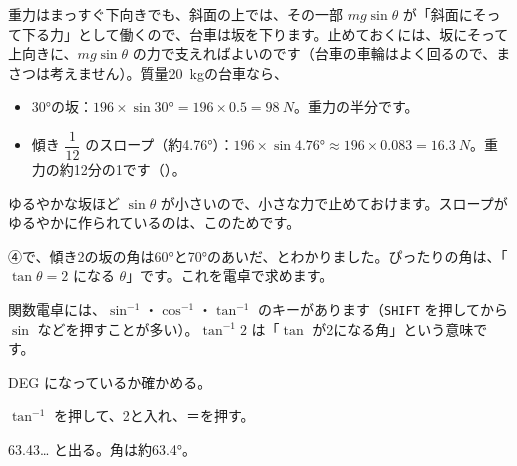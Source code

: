 重力はまっすぐ下向きでも、斜面の上では、その一部 $mg\sin\theta$ が「斜面にそって下る力」として働くので、台車は坂を下ります。止めておくには、坂にそって上向きに、$mg\sin\theta$ の力で支えればよいのです（台車の車輪はよく回るので、まさつは考えません）。質量\qty{20}{kg}の台車なら、
\begin{itemize}[leftmargin=1.2\zw, itemsep=1pt, topsep=2pt, label={\color{\bkTT}●}]
\item \ang{30}の坂：$196\times\sin\ang{30}=196\times0.5=\qty{98}{N}$。重力の半分です。
\item 傾き $\dfrac{1}{12}$ のスロープ（約\ang{4.76}）：$196\times\sin\ang{4.76}\approx196\times0.083=\qty{16.3}{N}$。重力の約12分の1です（）。
\end{itemize}
ゆるやかな坂ほど $\sin\theta$ が小さいので、小さな力で止めておけます。スロープがゆるやかに作られているのは、このためです。


\leavevmode\label{bk:4-6:gyaku}④で、傾き2の坂の角は\ang{60}と\ang{70}のあいだ、とわかりました。ぴったりの角は、「$\tan\theta=2$ になる $\theta$」です。これを電卓で求めます。

\noindent\begin{minipage}[c]{0.56\linewidth}
関数電卓には、$\sin^{-1}$・$\cos^{-1}$・$\tan^{-1}$ のキーがあります（\texttt{SHIFT} を押してから $\sin$ などを押すことが多い）。$\tan^{-1}2$ は「$\tan$ が2になる角」という意味です。
\begin{enumerate}[label={\bkcircled[bkOrange]{\arabic*}}, leftmargin=2.4\zw, itemsep=1pt, topsep=2pt]
\item DEG になっているか確かめる。
\item $\tan^{-1}$ を押して、2と入れ、＝を押す。
\item 63.43… と出る。角は約\ang{63.4}。
\end{enumerate}
\end{minipage}\hfill
\begin{minipage}[c]{0.4\linewidth}\centering
{}
\end{minipage}

